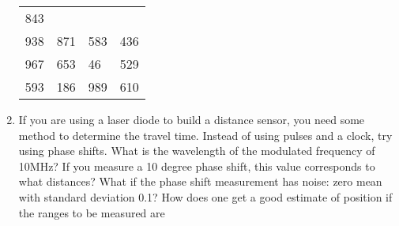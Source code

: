 \begin{enumerate}
\begin{longtable}[]{@{}llll@{}}
\begin{minipage}[t]{0.07\columnwidth}
  843\strut
  \end{minipage}\tabularnewline
  \begin{minipage}[t]{0.07\columnwidth}\raggedright
  938\strut
  \end{minipage} & \begin{minipage}[t]{0.07\columnwidth}\raggedright
  871\strut
  \end{minipage} & \begin{minipage}[t]{0.07\columnwidth}\raggedright
  583\strut
  \end{minipage} & \begin{minipage}[t]{0.07\columnwidth}\raggedright
  436\strut
  \end{minipage}\tabularnewline
  \begin{minipage}[t]{0.07\columnwidth}\raggedright
  967\strut
  \end{minipage} & \begin{minipage}[t]{0.07\columnwidth}\raggedright
  653\strut
  \end{minipage} & \begin{minipage}[t]{0.07\columnwidth}\raggedright
  46\strut
  \end{minipage} & \begin{minipage}[t]{0.07\columnwidth}\raggedright
  529\strut
  \end{minipage}\tabularnewline
  \begin{minipage}[t]{0.07\columnwidth}\raggedright
  593\strut
  \end{minipage} & \begin{minipage}[t]{0.07\columnwidth}\raggedright
  186\strut
  \end{minipage} & \begin{minipage}[t]{0.07\columnwidth}\raggedright
  989\strut
  \end{minipage} & \begin{minipage}[t]{0.07\columnwidth}\raggedright
  610\strut
  \end{minipage}\tabularnewline
  \bottomrule
  \end{longtable}
\item
  If you are using a laser diode to build a distance sensor, you need
  some method to determine the travel time. Instead of using pulses and
  a clock, try using phase shifts. What is the wavelength of the
  modulated frequency of 10MHz? If you measure a 10 degree phase shift,
  this value corresponds to what distances? What if the phase shift
  measurement has noise: zero mean with standard deviation 0.1? How does
  one get a good estimate of position if the ranges to be measured are

\end{enumerate}
